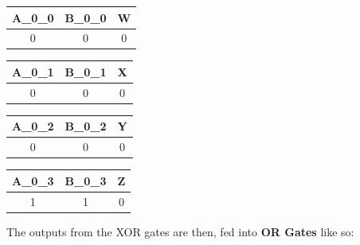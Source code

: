 \documentclass{article}
\begin{document}
\begin{minipage}[t]{0.5\linewidth}
    \begin{center}
        \begin{tabular}{ |c|c|c| }
            \hline
            {\bf A\_0\_0} & {\bf B\_0\_0} & {\bf W} \\
            \hline
            0 & 0 & 0\\
            \hline
        \end{tabular}
    \end{center}

    \vspace{.5cm}

    \begin{center}
        \begin{tabular}{ |c|c|c| }
            \hline
            {\bf A\_0\_1} & {\bf B\_0\_1} & {\bf X} \\
            \hline
            0 & 0 & 0\\
            \hline
        \end{tabular}
    \end{center}
\end{minipage}\hfill
\begin{minipage}[t]{0.5\linewidth}
    \begin{center}
        \begin{tabular}{ |c|c|c| }
            \hline
            {\bf A\_0\_2} & {\bf B\_0\_2} & {\bf Y} \\
            \hline
            0 & 0 & 0\\
            \hline
        \end{tabular}
    \end{center}
    \vspace{.5cm}
    \begin{center}
        \begin{tabular}{ |c|c|c| }
            \hline
            {\bf A\_0\_3} & {\bf B\_0\_3} & {\bf Z} \\
            \hline
            1 & 1 & 0\\
            \hline
        \end{tabular}
    \end{center}
\end{minipage}

\vspace{1cm}

The outputs from the XOR gates are then, fed into {\bf OR Gates} like so:

\vspace{1cm}
\end{document}
